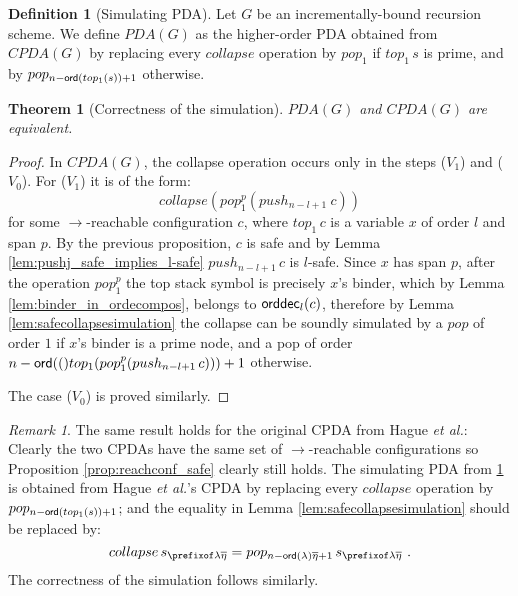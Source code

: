 \documentclass[a4paper,draft]{article}
\newtheorem{theorem}{Theorem}[section]
\theoremstyle{remark}
\newtheorem{remark}{Remark}[section]
\theoremstyle{definition}
\newtheorem{definition}{Definition}[section]
\newcommand\orddec{{\sf orddec}}
\begin{document}
\begin{definition}[Simulating PDA]
\label{simulating_pda}
Let $G$ be an incrementally-bound recursion scheme.
We define $PDA(G)$ as the higher-order PDA obtained from
$CPDA(G)$ by replacing every $collapse$ operation by $pop_1$ if $top_1\, s$ is prime, and by $pop_{n-{\sf ord}(top_1(s))+1}$ otherwise.
\end{definition}


\begin{theorem}[Correctness of the simulation]
$PDA(G)$ and $CPDA(G)$ are equivalent.
\end{theorem}
\begin{proof}
In $CPDA(G)$, the collapse operation occurs only in the steps ($V_1$) and ($V_0$). For ($V_1$) it is of the form:
$$collapse(pop_1^p(push_{n-l+1}~c))$$
for some $\rightarrow$-reachable configuration $c$, where $top_1\,c$ is a variable $x$ of order $l$ and span $p$.
By the previous proposition, $c$ is safe and by Lemma \ref{lem:pushj_safe_implies_l-safe} $push_{n-l+1}\, c$ is $l$-safe. Since $x$ has span $p$, after the operation $pop_1^p$ the top stack symbol is precisely $x$'s binder, which by Lemma \ref{lem:binder_in_ordecompos}, belongs to $\orddec_l(c)$, therefore
by Lemma \ref{lem:safecollapsesimulation} the collapse can be soundly simulated by a $pop$ of order
$1$ if $x$'s binder is a prime node, and a pop of order $n-{\sf ord}(()top_1(pop_1^p(push_{n-l+1}\,c))) +1$ otherwise.

The case ($V_0$) is proved similarly.
\end{proof}

\begin{remark}
The same result holds for the original CPDA from Hague \emph{et al.}:
Clearly the two CPDAs have the same set of $\rightarrow$-reachable configurations
so Proposition \ref{prop:reachconf_safe} clearly still holds.
The simulating PDA from \ref{simulating_pda} is obtained from
Hague \emph{et al.}'s CPDA by replacing every $collapse$ operation by $pop_{n-{\sf ord}(top_1(s))+1}$;
and the equality in Lemma \ref{lem:safecollapsesimulation} should be replaced by:
$$collapse\,s_{\prefixof\lambda\overline\eta} = pop_{n-\ord \lambda\overline\eta +1}\,s_{\prefixof\lambda\overline\eta} \ .$$
The correctness of the simulation follows similarly.
\end{remark}
\end{document}
